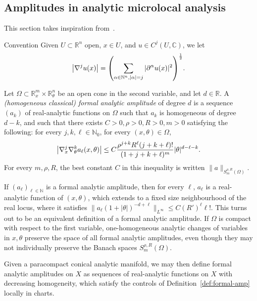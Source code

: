 \documentclass[AHL,Unicode,longabstracts,published]{cedram}
\newcommand\1{\mathds{1}}
\newcommand{\R}{\mathbb{R}}
\newcommand{\C}{\mathbb{C}}
\newcommand{\N}{\mathbb{N}}
\let\originalleft\left
\let\originalright\right
\renewcommand{\left}{\mathopen{}\mathclose\bgroup\originalleft}
\renewcommand{\right}{\aftergroup\egroup\originalright}
\begin{document}
\subsection{Amplitudes in analytic microlocal analysis}
\label{sec:ampl-analyt-micr}

This section takes inspiration from~\cite{deleporte_toeplitz_2018,sjostrand_singularites_1982,treves_analytic_2022}.



\begin{enonce*}{Convention}
Given $U\subset \R^n$ open, $x\in U$, and $u\in C^j(U,\C)$, we let
\[
\left|\nabla^ju(x)\right|=\left(\sum_{\alpha\in
\N^n,|\alpha|=j}|\partial^{\alpha}u(x)|^2\right)^{\frac 12}.
\]
\end{enonce*}

\begin{defi}\label{def:formal-amp}
Let $\Omega\subset \R^m_x\times \R^n_{\theta}$ be an open cone in the second variable, and let $d\in \R$. A \emph{(homogeneous classical) formal analytic amplitude} of degree $d$ is a sequence $(a_k)$ of real-analytic functions on $\Omega$ such that $a_k$ is homogeneous of degree $d-k$, and such that there exists $C>0, \rho>0,R>0,m>0$ satisfying the following: for every $j,k,\ell\in \N_0$, for every $(x,\theta)\in \Omega$,
\[
\left|\nabla^{j}_x\nabla^{k}_{\theta}a_\ell(x,\theta)\right|\leq C\frac{\rho^{j+k}R^\ell(j+k+\ell)!}{(1+j+k+\ell)^m}|\theta|^{d-\ell-k}.
\]
For every $m,\rho,R$, the best constant $C$ in this inequality is written $\|a\|_{S^{\rho,R}_m(\Omega)}$.
\end{defi}

If $(a_{\ell})_{\ell\in \N}$ is a formal analytic amplitude, then for every $\ell$, $a_{\ell}$ is a real-analytic function of $(x,\theta)$, which extends to a fixed size neighbourhood of the real locus, where it satisfies $\|a_{\ell}(1+|\theta|)^{-d+\ell}\|_{L^{\infty}}\leq C(R')^{\ell}\ell!$. This turns out to be an equivalent definition of a formal analytic amplitude. If $\Omega$ is compact with respect to the first variable, one-homogeneous analytic changes of variables in $x,\theta$ preserve the space of all formal analytic amplitudes, even though they may not individually preserve the Banach spaces $S^{\rho,R}_m(\Omega)$.

Given a paracompact conical analytic manifold, we may then define formal analytic amplitudes on $X$ as sequences of real-analytic functions on $X$ with decreasing homogeneity, which satisfy the controls of Definition~\ref{def:formal-amp} locally in charts.
\end{document}
